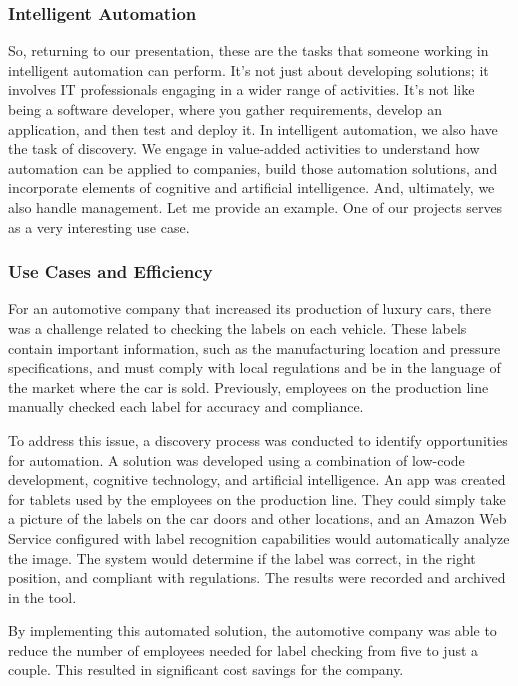 \subsubsection{Intelligent Automation}\label{intelligent-automation}

So, returning to our presentation, these are the tasks that
someone working in intelligent automation can perform. It's not just
about developing solutions; it involves IT professionals engaging in a
wider range of activities. It's not like being a software developer,
where you gather requirements, develop an application, and then test and
deploy it. In intelligent automation, we also have the task of
discovery. We engage in value-added activities to understand how
automation can be applied to companies, build those automation
solutions, and incorporate elements of cognitive and artificial
intelligence. And, ultimately, we also handle management. Let me provide
an example. One of our projects serves as a very interesting use case.

\subsubsection{Use Cases and Efficiency}\label{use-cases-and-efficiency}

For an automotive company that increased its production of luxury cars,
there was a challenge related to checking the labels on each vehicle.
These labels contain important information, such as the manufacturing
location and pressure specifications, and must comply with local
regulations and be in the language of the market where the car is sold.
Previously, employees on the production line manually checked each label
for accuracy and compliance.

To address this issue, a discovery process was conducted to identify
opportunities for automation. A solution was developed using a
combination of low-code development, cognitive technology, and
artificial intelligence. An app was created for tablets used by the
employees on the production line. They could simply take a picture of
the labels on the car doors and other locations, and an Amazon Web
Service configured with label recognition capabilities would
automatically analyze the image. The system would determine if the label
was correct, in the right position, and compliant with regulations. The
results were recorded and archived in the tool.

By implementing this automated solution, the automotive company was able
to reduce the number of employees needed for label checking from five to
just a couple. This resulted in significant cost savings for the
company.

